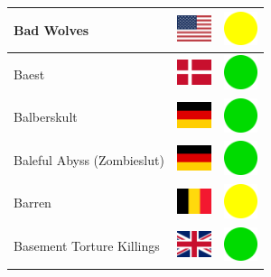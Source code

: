 \documentclass[12pt, a4paper, twoside]{report}
\begin{document}
\begin{center}
\begin{longtable}{|p{5cm}|p{2cm}|p{2cm}|}
 Bad Wolves                                                 & \includegraphics[width=1cm]{../4x3/us} &   \includegraphics[width=1cm]{../likes/m} \\ \hline
 Baest                                                      & \includegraphics[width=1cm]{../4x3/dk} &   \includegraphics[width=1cm]{../likes/y} \\ \hline
 Balberskult                                                & \includegraphics[width=1cm]{../4x3/de} &   \includegraphics[width=1cm]{../likes/y} \\ \hline
 Baleful Abyss (Zombieslut)                                 & \includegraphics[width=1cm]{../4x3/de} &   \includegraphics[width=1cm]{../likes/y} \\ \hline
 Barren                                                     & \includegraphics[width=1cm]{../4x3/be} &   \includegraphics[width=1cm]{../likes/m} \\ \hline
 Basement Torture Killings                                  & \includegraphics[width=1cm]{../4x3/gb} &   \includegraphics[width=1cm]{../likes/y} \\ \hline

\end{longtable}
\end{center}
\end{document}
